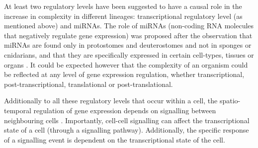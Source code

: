 At least two regulatory levels have been suggested to have a causal role in the increase in complexity in different lineages:  transcriptional regulatory level (as mentioned above) \citep{Davidson2001} and miRNAs. The role of miRNAs (non-coding RNA molecules that negatively regulate gene expression) was proposed after the observation that miRNAs are found only in protostomes and deuterostomes and not in sponges or cnidarians, and that they are specifically expressed in certain cell-types, tissues or organs \citep{Sempere2006}.
%
It could be expected however that the complexity of an organism could be reflected at any level of gene expression regulation, whether transcriptional, post-transcriptional, translational or post-translational.

Additionally to all these regulatory levels that occur within a cell, the spatio-temporal regulation of gene expression depends on signalling between neighbouring cells \citep{Gilbert2014}. Importantly, cell-cell signalling can affect the transcriptional state of a cell (through a signalling pathway). Additionally, the specific response of a signalling event is dependent on the transcriptional state of the cell.



